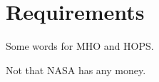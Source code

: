 %
%
\section{Requirements}

Some words for \ac{MHO} and \ac{HOPS}.

Not that NASA has any money.

%
%

